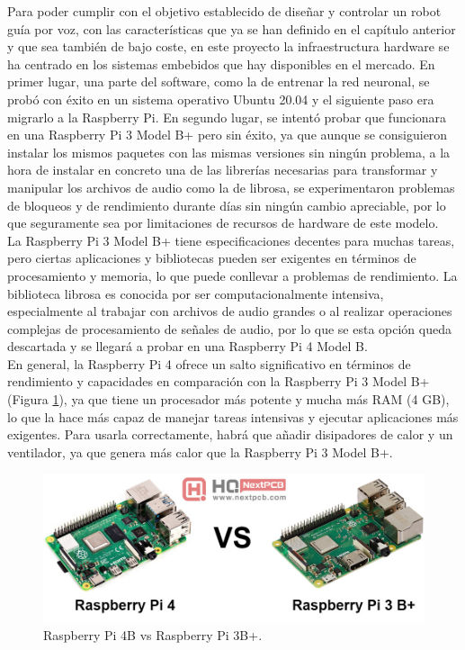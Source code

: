 Para poder cumplir con el objetivo establecido de diseñar y controlar un robot guía por voz, con las características que ya se han definido en el capítulo anterior y que sea también de bajo coste, en este proyecto la infraestructura hardware se ha centrado en los sistemas embebidos que hay disponibles en el mercado. En primer lugar, una parte del software, como la de entrenar la red neuronal, se probó con éxito en un sistema operativo Ubuntu 20.04 y el siguiente paso era migrarlo a la Raspberry Pi. En segundo lugar, se intentó probar que funcionara en una Raspberry Pi 3 Model B+ pero sin éxito, ya que aunque se consiguieron instalar los mismos paquetes con las mismas versiones sin ningún problema, a la hora de instalar en concreto una de las librerías necesarias para transformar y manipular los archivos de audio como la de librosa, se experimentaron problemas de bloqueos y de rendimiento durante días sin ningún cambio apreciable, por lo que seguramente sea por limitaciones de recursos de hardware de este modelo.\\

La Raspberry Pi 3 Model B+ tiene especificaciones decentes para muchas tareas, pero ciertas aplicaciones y bibliotecas pueden ser exigentes en términos de procesamiento y memoria, lo que puede conllevar a problemas de rendimiento. La biblioteca librosa es conocida por ser computacionalmente intensiva, especialmente al trabajar con archivos de audio grandes o al realizar operaciones complejas de procesamiento de señales de audio, por lo que se esta opción queda descartada y se llegará a probar en una Raspberry Pi 4 Model B.\\

En general, la Raspberry Pi 4 ofrece un salto significativo en términos de rendimiento y capacidades en comparación con la Raspberry Pi 3 Model B+ (Figura \ref{fig:Raspberry}), ya que tiene un procesador más potente y mucha más RAM (4 GB), lo que la hace más capaz de manejar tareas intensivas y ejecutar aplicaciones más exigentes. Para usarla correctamente, habrá que añadir disipadores de calor y un ventilador, ya que genera más calor que la Raspberry Pi 3 Model B+.



\begin{figure}[H]
  \centering
  \includegraphics[scale=0.4]{figs/rasps} %
  \caption{Raspberry Pi 4B vs Raspberry Pi 3B+.}
  \label{fig:Raspberry}
\end{figure}


